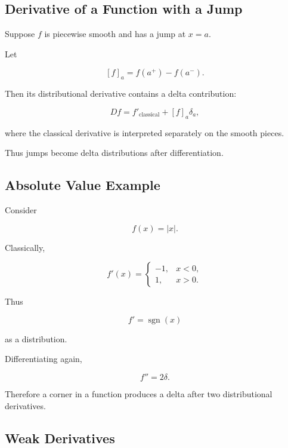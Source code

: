 \subsection{Derivative of a Function with a Jump}
\label{subsec:jump-derivative}

Suppose \(f\) is piecewise smooth and has a jump at \(x=a\).

Let

\[
[f]_a
=
f(a^+)-f(a^-).
\]

Then its distributional derivative contains a delta contribution:

\[
\boxed{
D f
=
f'_{\mathrm{classical}}
+
[f]_a\delta_a,
}
\]

where the classical derivative is interpreted separately on the smooth
pieces.

Thus jumps become delta distributions after differentiation.

\subsection{Absolute Value Example}
\label{subsec:absolute-value-distribution}

Consider

\[
f(x)=|x|.
\]

Classically,

\[
f'(x)
=
\begin{cases}
-1, & x<0,\\
1, & x>0.
\end{cases}
\]

Thus

\[
f'
=
\operatorname{sgn}(x)
\]

as a distribution.

Differentiating again,

\[
\boxed{
f''=2\delta.
}
\]

Therefore a corner in a function produces a delta after two
distributional derivatives.

\subsection{Weak Derivatives}
\label{subsec:weak-derivatives}

